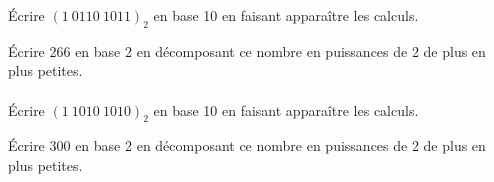 \documentclass[a4paper,12pt]{article}
\begin{document}

\'Ecrire $(1\ 0110\ 1011)_2$ en base 10 en faisant apparaître les calculs.\\


\'Ecrire 266 en base 2 en décomposant ce nombre en puissances de 2 de plus en plus petites.\\

\\

\'Ecrire $(1\ 1010\ 1010)_2$ en base 10 en faisant apparaître les calculs.\\


\newpage

\'Ecrire 300 en base 2 en décomposant ce nombre en puissances de 2 de plus en plus petites.\\

\\
\end{document}
